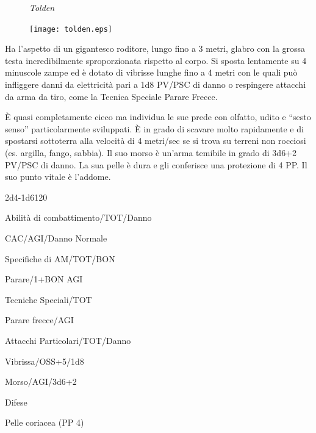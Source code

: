 
\begin{figure}[bt]
{\centering\it Tolden\par
\texttt{[image: tolden.eps]}}
\end{figure}

Ha l'aspetto di un gigantesco roditore, lungo fino a 3 metri, glabro
con la grossa testa incredibilmente sproporzionata rispetto al corpo.
Si sposta lentamente su 4 minuscole zampe ed \`e dotato di vibrisse
lunghe fino a 4 metri con le quali pu\`o infliggere danni da
elettricit\`a pari a 1d8 PV/PSC di danno o respingere attacchi da
arma da tiro, come la Tecnica Speciale Parare Frecce.

\`E quasi completamente cieco ma individua le sue prede con olfatto,
udito e ``sesto senso'' particolarmente sviluppati. \`E in grado di
scavare molto rapidamente e di spostarsi sottoterra alla velocit\`a
di 4 metri/sec se si trova su terreni non rocciosi (es. argilla,
fango, sabbia). Il suo morso \`e un'arma temibile in grado di
3d6+2 PV/PSC di danno. La sua pelle \`e dura e gli conferisce una
protezione di 4 PP. Il suo punto vitale \`e l'addome.

 {2d4}{-1d6}{120}

\begin{parmostro}{Abilit\`a di combattimento/TOT/Danno}
\item CAC/AGI/Danno Normale
\end{parmostro}

\begin{parmostro}{Specifiche di AM/TOT/BON}
\item Parare/1+BON AGI
\end{parmostro}

\begin{parmostro}{Tecniche Speciali/TOT}
\item Parare frecce/AGI
\end{parmostro}

\begin{parmostro}{Attacchi Particolari/TOT/Danno}
\item Vibrissa/OSS+5/1d8
\item Morso/AGI/3d6+2
\end{parmostro}

\begin{parmostro}{Difese}
\item Pelle coriacea (PP 4)
\end{parmostro}

